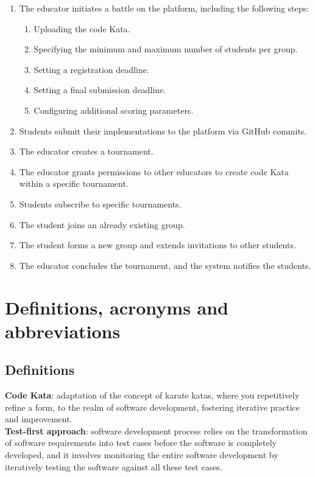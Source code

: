 \documentclass[12pt, a4paper]{report}
\begin{document}
    \begin{enumerate}
        \item The educator initiates a battle on the platform, including the following steps:
            \begin{enumerate}
                \item Uploading the code Kata.
                \item Specifying the minimum and maximum number of students per group.
                \item Setting a registration deadline.
                \item Setting a final submission deadline.
                \item Configuring additional scoring parameters.
            \end{enumerate}
        \item Students submit their implementations to the platform via GitHub commits.
        \item The educator creates a tournament.
        \item The educator grants permissions to other educators to create code Kata within a specific tournament.
        \item Students subscribe to specific tournaments.
        \item The student joins an already existing group.
        \item The student forms a new group and extends invitations to other students.
        \item The educator concludes the tournament, and the system notifies the students.
    \end{enumerate}

    
    \section{Definitions, acronyms and abbreviations}
    \subsection{Definitions}
    \textbf{Code Kata}: adaptation of the concept of karate katas, where you repetitively refine a form, to the realm of software development, 
        fostering iterative practice and improvement. 
    \\
    \textbf{Test-first approach}:  software development process relies on the transformation of software requirements into test cases before 
        the software is completely developed, and it involves monitoring the entire software development by iteratively testing the software 
        against all these test cases.
\end{document}
